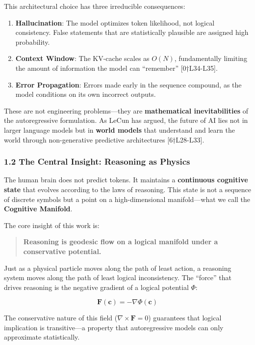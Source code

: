 \documentclass[
  11pt,
  a4paper,
]{article}
\providecommand{\tightlist}{%
  \setlength{\itemsep}{0pt}\setlength{\parskip}{0pt}}
\begin{document}
This architectural choice has three irreducible consequences:

\begin{enumerate}
\def\labelenumi{\arabic{enumi}.}
\tightlist
\item
  \textbf{Hallucination}: The model optimizes token likelihood, not
  logical consistency. False statements that are statistically plausible
  are assigned high probability.
\item
  \textbf{Context Window}: The KV-cache scales as \(O(N)\),
  fundamentally limiting the amount of information the model can
  ``remember'' {[}0†L34-L35{]}.
\item
  \textbf{Error Propagation}: Errors made early in the sequence
  compound, as the model conditions on its own incorrect outputs.
\end{enumerate}

These are not engineering problems---they are \textbf{mathematical
inevitabilities} of the autoregressive formulation. As LeCun has argued,
the future of AI lies not in larger language models but in \textbf{world
models} that understand and learn the world through non-generative
predictive architectures {[}6†L28-L33{]}.

\subsubsection{1.2 The Central Insight: Reasoning as
Physics}\label{the-central-insight-reasoning-as-physics}

The human brain does not predict tokens. It maintains a
\textbf{continuous cognitive state} that evolves according to the laws
of reasoning. This state is not a sequence of discrete symbols but a
point on a high-dimensional manifold---what we call the
\textbf{Cognitive Manifold}.

The core insight of this work is:

\begin{quote}
\textbf{Reasoning is geodesic flow on a logical manifold under a
conservative potential.}
\end{quote}

Just as a physical particle moves along the path of least action, a
reasoning system moves along the path of least logical inconsistency.
The ``force'' that drives reasoning is the negative gradient of a
logical potential \(\Phi\):

\[\mathbf{F}(\mathbf{c}) = -\nabla \Phi(\mathbf{c})\]

The conservative nature of this field (\(\nabla \times \mathbf{F} = 0\))
guarantees that logical implication is transitive---a property that
autoregressive models can only approximate statistically.
\end{document}
